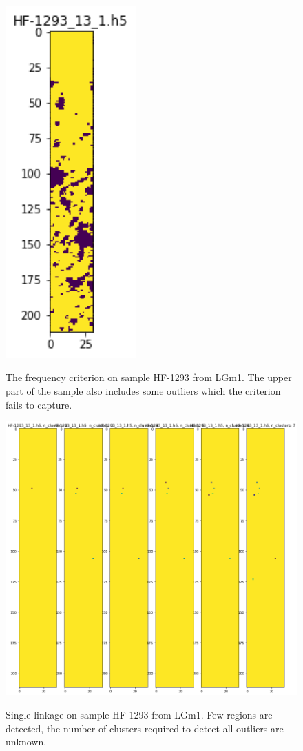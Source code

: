 \documentclass[a4paper, 12pt, oneside]{book}
\begin{document}
\begin{appendices}
\begin{figure}[H]
    \centering
{\includegraphics[width=5cm]{images/AdriansCriterion/LGm-1/HF-1293_13_1.h5_1.png} }
\caption{The frequency criterion on sample HF-1293 from LGm1. The upper part of the sample also includes some outliers which the criterion fails to capture.  \label{fig:SL_HF868}}%

\end{figure}

\begin{figure}[H]

    \centering
{\includegraphics[width=15cm]{images/Single_linkage/LGm-1/HF-1293_13_1.h5_1.png} }
\caption{Single linkage on sample HF-1293 from LGm1. Few regions are detected, the number of clusters required to detect all outliers are unknown. \label{fig:SL_HF868}}%


\end{figure}
\end{appendices}
\end{document}
